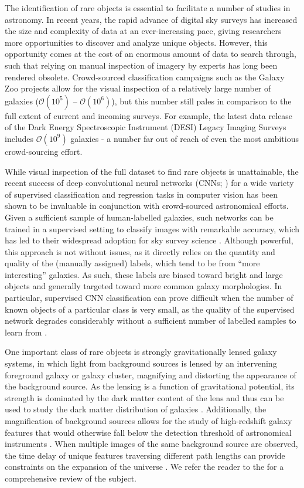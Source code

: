 \documentclass{aastex631}
\begin{document}
The identification of rare objects is essential to facilitate a number of studies in astronomy. In recent years, the rapid advance of digital sky surveys has increased the size and complexity of data at an ever-increasing pace, giving researchers more opportunities to discover and analyze unique objects. However, this opportunity comes at the cost of an enormous amount of data to search through, such that relying on manual inspection of imagery by experts has long been rendered obsolete. Crowd-sourced classification campaigns such as the Galaxy Zoo projects \citep{GZ1, GZ2} allow for the visual inspection of a relatively large number of galaxies ($\mathcal{O}(10^5)$ -- $\mathcal{O}(10^6)$), but this number still pales in comparison to the full extent of current and incoming surveys. For example, the latest data release of the Dark Energy Spectroscopic Instrument (DESI) Legacy Imaging Surveys \citep{DECaLS} includes $\mathcal{O}(10^9)$ galaxies - a number far out of reach of even the most ambitious crowd-sourcing effort.

While visual inspection of the full dataset to find rare objects is unattainable, the recent success of deep convolutional neural networks (CNNs; \cite{DL}) for a wide variety of supervised classification and regression tasks in computer vision has been shown to be invaluable in conjunction with crowd-sourced astronomical efforts. Given a sufficient sample of human-labelled galaxies, such networks can be trained in a supervised setting to classify images with remarkable accuracy, which has led to their widespread adoption for sky survey science \citep{GZ3, Vega-Ferrero_morphology, HuangI}. Although powerful, this approach is not without issues, as it directly relies on the quantity and quality of the (manually assigned) labels, which tend to be from ``more interesting'' galaxies. As such, these labels are biased toward bright and large objects and generally targeted toward more common galaxy morphologies. In particular, supervised CNN classification can prove difficult when the number of known objects of a particular class is very small, as the quality of the supervised network degrades considerably without a sufficient number of labelled samples to learn from \citep{Hayat_2021}.    

One important class of rare objects is strongly gravitationally lensed galaxy systems, in which light from background sources is lensed by an intervening foreground galaxy or galaxy cluster, magnifying and distorting the appearance of the background source. As the lensing is a function of gravitational potential, its strength is dominated by the dark matter content of the lens and thus can be used to study the dark matter distribution of galaxies \citep{flux_ratio}. Additionally, the magnification of background sources allows for the study of high-redshift galaxy features that would otherwise fall below the detection threshold of astronomical instruments \citep{faint_lens}. When multiple images of the same background source are observed, the time delay of unique features traversing different path lengths can provide constraints on the expansion of the universe \citep{Holicow}. We refer the reader to the \citealt{strong_lensing_summary} for a comprehensive review of the subject.
\end{document}
